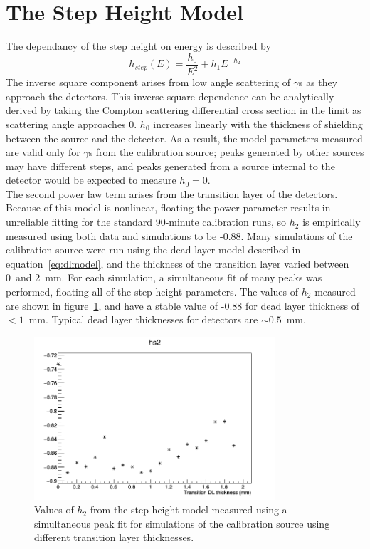 \documentclass[/main.tex]{subfiles}
\begin{document}
\section{The Step Height Model} \label{sec:stepheight}
The dependancy of the step height on energy is described by
\begin{equation}
  h_{step}(E) = \frac{h_0}{E^2} + h_1E^{-h_2}
\end{equation}
The inverse square component arises from low angle scattering of $\gamma$s as they approach the detectors.
This inverse square dependence can be analytically derived by taking the Compton scattering differential cross section in the limit as scattering angle approaches 0\cite{2011Oberer}.
$h_0$ increases linearly with the thickness of shielding between the source and the detector.
As a result, the model parameters measured are valid only for $\gamma$s from the calibration source; peaks generated by other sources may have different steps, and peaks generated from a source internal to the detector would be expected to measure $h_0=0$.
\\
The second power law term arises from the transition layer of the detectors.
Because of this model is nonlinear, floating the power parameter results in unreliable fitting for the standard 90-minute calibration runs, so $h_2$ is empirically measured using both data and simulations to be -0.88.
Many simulations of the  calibration source were run using the dead layer model described in equation~\ref{eq:dlmodel}, and the thickness of the transition layer varied between 0~and 2~mm.
For each simulation, a simultaneous fit of many peaks was performed, floating all of the step height parameters.
The values of $h_2$ measured are shown in figure~\ref{fig:stepheightpars_sim}, and have a stable value of -0.88 for dead layer thickness of $<1$~mm.
Typical dead layer thicknesses for detectors are $\sim0.5$~mm.
\begin{figure}[h]
  \centering
  \includegraphics[width=0.8\textwidth]{hs2_tl}
  \caption[Simulated dependance of $h_2$ on transition layer thickness] {\label{fig:stepheightpars_sim}
    Values of $h_2$ from the step height model measured using a simultaneous peak fit for simulations of the  calibration source using different transition layer thicknesses.
  }
\end{figure}
\end{document}
